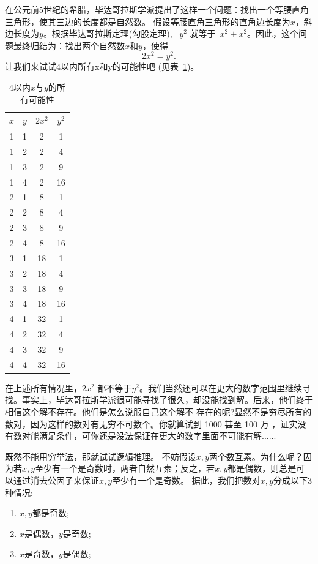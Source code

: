 在公元前5世纪的希腊，毕达哥拉斯学派提出了这样一个问题：找出一个等腰直角三角形，使其三边的长度都是自然数。
假设等腰直角三角形的直角边长度为$x$，斜边长度为$y$。根据毕达哥拉斯定理(勾股定理), ~$y^2$ 就等于~$x^2+x^2$。因此，这个问题最终归结为：找出两个自然数$x$和$y$，使得
\begin{equation}\label{eqn}
2x^2=y^2.
\end{equation}
让我们来试试4以内所有x和y的可能性吧 (见表~\ref{tab:example})。
\begin{table}[htbp]
\centering
\caption{4以内$x$与$y$的所有可能性}
\begin{tabular}{|c|c|c|c|}
\hline
$x$ & $y$ & $2x^2$ & $y^2$ \\
\hline
1 & 1 & 2 & 1 \\
\hline
1 & 2 & 2 & 4 \\
\hline
1 & 3 & 2 & 9 \\
\hline
1 & 4 & 2 & 16 \\
\hline
2 & 1 & 8 & 1 \\
\hline
2 & 2 & 8 & 4 \\
\hline
2 & 3 & 8 & 9 \\
\hline
2 & 4 & 8 & 16 \\
\hline
3 & 1 & 18 & 1 \\
\hline
3 & 2 & 18 & 4 \\
\hline
3 & 3 & 18 & 9 \\
\hline
3 & 4 & 18 & 16 \\
\hline
4 & 1 & 32 & 1 \\
\hline
4 & 2 & 32 & 4 \\
\hline
4 & 3 & 32 & 9 \\
\hline
4 & 4 & 32 & 16 \\
\hline
\end{tabular}
\label{tab:example}
\end{table}
在上述所有情况里，$2x^2$ 都不等于$y^2$。我们当然还可以在更大的数字范围里继续寻找。事实上，毕达哥拉斯学派很可能寻找了很久，却没能找到解。后来，他们终于相信这个解不存在。他们是怎么说服自己这个解不 存在的呢?显然不是穷尽所有的数对，因为这样的数对有无穷不可数个。你就算试到 1000 甚至 100 万 ，证实没有数对能满足条件，可你还是没法保证在更大的数字里面不可能有解......

既然不能用穷举法，那就试试逻辑推理。 
不妨假设$x,y$两个数互素。为什么呢？因为若$x,y$至少有一个是奇数时，两者自然互素；反之，若$x,y$都是偶数，则总是可以通过消去公因子来保证$x,y$至少有一个是奇数。
据此，我们把数对$x,y$分成以下3种情况: 
\begin{enumerate}
\item $x,y$都是奇数;
\item $x$是偶数，$y$是奇数;
\item $x$是奇数，$y$是偶数;
\end{enumerate}

